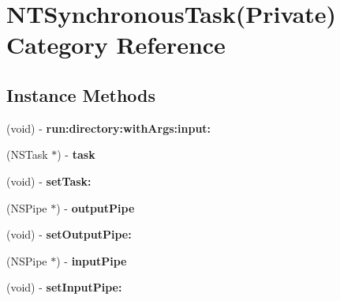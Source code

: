 \hypertarget{category_n_t_synchronous_task_07_private_08}{}\section{N\+T\+Synchronous\+Task(Private) Category Reference}
\label{category_n_t_synchronous_task_07_private_08}
\subsection*{Instance Methods}
\begin{DoxyCompactItemize}
\item 
\mbox{\label{category_n_t_synchronous_task_07_private_08_a8a2dbff09dfabd79854f1a938fe7d0e8}} 
(void) -\/ {\bfseries run\+:directory\+:with\+Args\+:input\+:}
\item 
\mbox{\label{category_n_t_synchronous_task_07_private_08_ae47ebfefa4dd790a064f8db229bbe065}} 
(N\+S\+Task $\ast$) -\/ {\bfseries task}
\item 
\mbox{\label{category_n_t_synchronous_task_07_private_08_a190b6526dbd742eda6be9c1681224e30}} 
(void) -\/ {\bfseries set\+Task\+:}
\item 
\mbox{\label{category_n_t_synchronous_task_07_private_08_a3975f1f87bc6120a36cd464d7c1a8012}} 
(N\+S\+Pipe $\ast$) -\/ {\bfseries output\+Pipe}
\item 
\mbox{\label{category_n_t_synchronous_task_07_private_08_a28adc92c90e3b3b02a5db1201c6ee6a6}} 
(void) -\/ {\bfseries set\+Output\+Pipe\+:}
\item 
\mbox{\label{category_n_t_synchronous_task_07_private_08_a4a2259a98fc5ca9e502a786063eea067}} 
(N\+S\+Pipe $\ast$) -\/ {\bfseries input\+Pipe}
\item 
\mbox{\label{category_n_t_synchronous_task_07_private_08_a7506c40b6885fca8af8774e4ea52300d}} 
(void) -\/ {\bfseries set\+Input\+Pipe\+:}

\end{DoxyCompactItemize}
